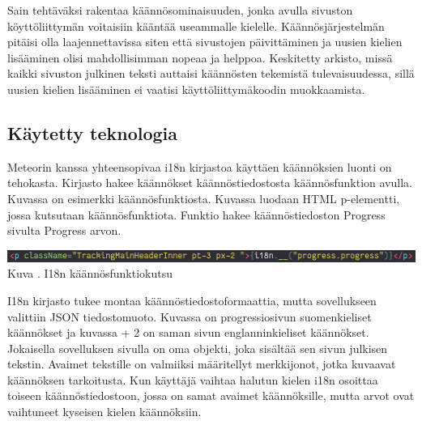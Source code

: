 \documentclass[11pt,a4paper,titlepage,oneside]{article}
\begin{document}
Sain tehtäväksi rakentaa käännösominaisuuden, jonka avulla sivuston köyttöliittymän voitaisiin kääntää useammalle kielelle.
Käännösjärjestelmän pitäisi olla laajennettavissa siten että sivustojen päivittäminen ja uusien kielien lisääminen 
olisi mahdollisimman nopeaa ja helppoa.
Keskitetty arkisto, missä kaikki sivuston julkinen teksti auttaisi käännösten tekemistä tulevaisuudessa,
sillä uusien kielien lisääminen ei vaatisi käyttöliittymäkoodin muokkaamista.







\subsection{Käytetty teknologia}





Meteorin kanssa yhteensopivaa i18n kirjastoa käyttäen käännöksien luonti on tehokasta.
Kirjasto hakee käännökset käännöstiedostosta käännösfunktion avulla.
Kuvassa \nextImageCount{} on esimerkki käännösfunktiosta.
Kuvassa luodaan HTML p-elementti, jossa kutsutaan käännösfunktiota. 
Funktio hakee käännöstiedoston Progress sivulta Progress arvon.\\
\medskip

\bigskip
\includegraphics[width = 15cm]{src/public/oppar/translationcall.png}\\
Kuva \getImgCount. {} I18n käännösfunktiokutsu 
\medskip



I18n kirjasto tukee montaa käännöstiedostoformaattia, mutta sovellukseen valittiin JSON tiedostomuoto.
Kuvassa \nextImageCount{} on progressiosivun suomenkieliset käännökset ja kuvassa {\the\numexpr \theimgCounter + 2 } on saman sivun englanninkieliset käännökset.
Jokaisella sovelluksen sivulla on oma objekti, joka sisältää sen sivun julkisen tekstin. 
Avaimet tekstille on valmiiksi määritellyt merkkijonot, jotka kuvaavat käännöksen tarkoitusta.
Kun käyttäjä vaihtaa halutun kielen i18n osoittaa toiseen käännöstiedostoon, 
jossa on samat avaimet käännöksille, mutta arvot ovat vaihtuneet kyseisen kielen käännöksiin.
\medskip
\end{document}
